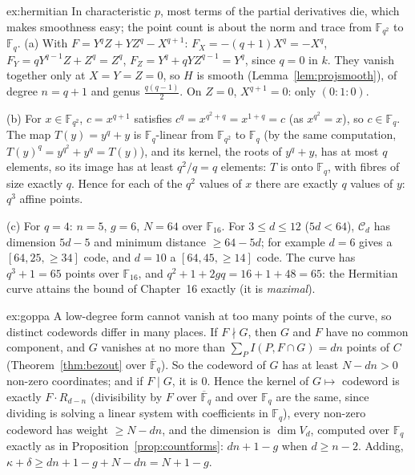 \begin{solution}{ex:hermitian}
\idea In characteristic $p$, most terms of the partial derivatives die, which makes smoothness easy; the point count is about the norm and trace from
$\mathbb F_{q^2}$ to $\mathbb F_q$.
\writeup (a) With $F=Y^qZ+YZ^q-X^{q+1}$: $F_X=-(q+1)X^q=-X^q$, $F_Y=qY^{q-1}Z+Z^q=Z^q$, $F_Z=Y^q+qYZ^{q-1}=Y^q$, since $q=0$ in $k$. They vanish together only at
$X=Y=Z=0$, so $H$ is smooth (Lemma~\ref{lem:projsmooth}), of degree $n=q+1$ and genus $\frac{q(q-1)}2$. On $Z=0$, $X^{q+1}=0$: only $(0:1:0)$.

(b) For $x\in\mathbb F_{q^2}$, $c=x^{q+1}$ satisfies $c^q=x^{q^2+q}=x^{1+q}=c$ (as $x^{q^2}=x$), so $c\in\mathbb F_q$. The map $T(y)=y^q+y$ is $\mathbb F_q$-linear
from $\mathbb F_{q^2}$ to $\mathbb F_q$ (by the same computation, $T(y)^q=y^{q^2}+y^q=T(y)$), and its kernel, the roots of $y^q+y$, has at most $q$ elements, so its image
has at least $q^2/q=q$ elements: $T$ is onto $\mathbb F_q$, with fibres of size exactly $q$. Hence for each of the $q^2$ values of $x$ there are exactly $q$
values of $y$: $q^3$ affine points.

(c) For $q=4$: $n=5$, $g=6$, $N=64$ over $\mathbb F_{16}$. For $3\le d\le12$ ($5d<64$), $\mathcal C_d$ has dimension $5d-5$ and minimum distance $\ge64-5d$; for
example $d=6$ gives a $[64,25,\ge34]$ code, and $d=10$ a $[64,45,\ge14]$ code. The curve has $q^3+1=65$ points over $\mathbb F_{16}$, and
$q^2+1+2gq=16+1+48=65$: the Hermitian curve attains the bound of Chapter~16 exactly (it is \emph{maximal}).
\end{solution}

\begin{solution}{ex:goppa}
\idea A low-degree form cannot vanish at too many points of the curve, so distinct codewords differ in many places.
\writeup If $F\nmid G$, then $G$ and $F$ have no common component, and $G$ vanishes at no more than $\sum_PI(P,F\cap G)=dn$ points of $C$
(Theorem~\ref{thm:bezout} over $\overline{\mathbb F}_q$). So the codeword of $G$ has at least $N-dn>0$ non-zero coordinates; and if $F\mid G$, it is $0$.
Hence the kernel of $G\mapsto$ codeword is exactly $F\cdot R_{d-n}$ (divisibility by $F$ over $\overline{\mathbb F}_q$ and over $\mathbb F_q$ are the same,
since dividing is solving a linear system with coefficients in $\mathbb F_q$), every non-zero codeword has weight $\ge N-dn$, and the dimension is
$\dim V_d$, computed over $\mathbb F_q$ exactly as in Proposition~\ref{prop:countforms}: $dn+1-g$ when $d\ge n-2$. Adding,
$\kappa+\delta\ge dn+1-g+N-dn=N+1-g$.
\end{solution}

